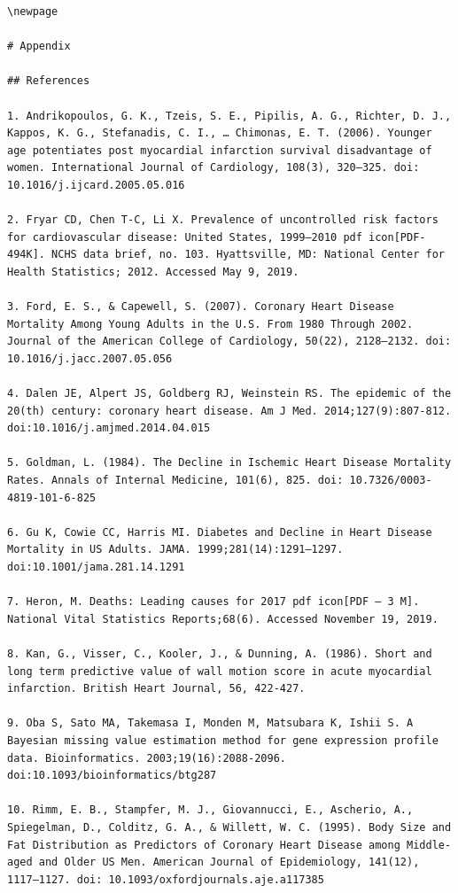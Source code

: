 \documentclass[
]{article}
\begin{document}
\begin{verbatim}
\newpage

# Appendix

## References

1. Andrikopoulos, G. K., Tzeis, S. E., Pipilis, A. G., Richter, D. J., Kappos, K. G., Stefanadis, C. I., … Chimonas, E. T. (2006). Younger age potentiates post myocardial infarction survival disadvantage of women. International Journal of Cardiology, 108(3), 320–325. doi: 10.1016/j.ijcard.2005.05.016

2. Fryar CD, Chen T-C, Li X. Prevalence of uncontrolled risk factors for cardiovascular disease: United States, 1999–2010 pdf icon[PDF-494K]. NCHS data brief, no. 103. Hyattsville, MD: National Center for Health Statistics; 2012. Accessed May 9, 2019.

3. Ford, E. S., & Capewell, S. (2007). Coronary Heart Disease Mortality Among Young Adults in the U.S. From 1980 Through 2002. Journal of the American College of Cardiology, 50(22), 2128–2132. doi: 10.1016/j.jacc.2007.05.056

4. Dalen JE, Alpert JS, Goldberg RJ, Weinstein RS. The epidemic of the 20(th) century: coronary heart disease. Am J Med. 2014;127(9):807‐812. doi:10.1016/j.amjmed.2014.04.015

5. Goldman, L. (1984). The Decline in Ischemic Heart Disease Mortality Rates. Annals of Internal Medicine, 101(6), 825. doi: 10.7326/0003-4819-101-6-825

6. Gu K, Cowie CC, Harris MI. Diabetes and Decline in Heart Disease Mortality in US Adults. JAMA. 1999;281(14):1291–1297. doi:10.1001/jama.281.14.1291

7. Heron, M. Deaths: Leading causes for 2017 pdf icon[PDF – 3 M]. National Vital Statistics Reports;68(6). Accessed November 19, 2019.

8. Kan, G., Visser, C., Kooler, J., & Dunning, A. (1986). Short and long term predictive value of wall motion score in acute myocardial infarction. British Heart Journal, 56, 422-427.

9. Oba S, Sato MA, Takemasa I, Monden M, Matsubara K, Ishii S. A Bayesian missing value estimation method for gene expression profile data. Bioinformatics. 2003;19(16):2088‐2096. doi:10.1093/bioinformatics/btg287

10. Rimm, E. B., Stampfer, M. J., Giovannucci, E., Ascherio, A., Spiegelman, D., Colditz, G. A., & Willett, W. C. (1995). Body Size and Fat Distribution as Predictors of Coronary Heart Disease among Middle-aged and Older US Men. American Journal of Epidemiology, 141(12), 1117–1127. doi: 10.1093/oxfordjournals.aje.a117385 


\end{verbatim}
\end{document}
